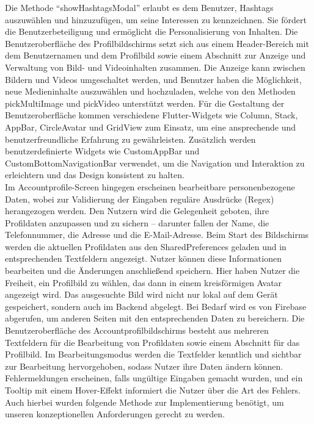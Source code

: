Die Methode ``showHashtagsModal'' erlaubt es dem Benutzer, Hashtags auszuwählen und hinzuzufügen, um seine Interessen zu kennzeichnen. Sie fördert die Benutzerbeteiligung und ermöglicht die Personalisierung von Inhalten.
Die Benutzeroberfläche des Profilbildschirms setzt sich aus einem Header-Bereich mit dem Benutzernamen und dem Profilbild sowie einem Abschnitt zur Anzeige und Verwaltung von Bild- und Videoinhalten zusammen. 
Die Anzeige kann zwischen Bildern und Videos umgeschaltet werden, und Benutzer haben die Möglichkeit, neue Medieninhalte auszuwählen und hochzuladen, welche von den Methoden pickMultiImage und pickVideo unterstützt werden. 
Für die Gestaltung der Benutzeroberfläche kommen verschiedene Flutter-Widgets wie Column, Stack, AppBar, CircleAvatar und GridView zum Einsatz, um eine ansprechende und benutzerfreundliche Erfahrung zu gewährleisten.
Zusätzlich werden benutzerdefinierte Widgets wie CustomAppBar und CustomBottomNavigationBar verwendet, um die Navigation und Interaktion zu erleichtern und das Design konsistent zu halten.
\\
Im Accountprofile-Screen hingegen erscheinen bearbeitbare personenbezogene Daten, wobei zur Validierung der Eingaben reguläre Ausdrücke (Regex) herangezogen werden. 
Den Nutzern wird die Gelegenheit geboten, ihre Profildaten anzupassen und zu sichern – darunter fallen der Name, die Telefonnummer, die Adresse und die E-Mail-Adresse. 
Beim Start des Bildschirms werden die aktuellen Profildaten aus den SharedPreferences geladen und in entsprechenden Textfeldern angezeigt. 
Nutzer können diese Informationen bearbeiten und die Änderungen anschließend speichern. Hier haben Nutzer die Freiheit, ein Profilbild zu wählen, das dann in einem kreisförmigen Avatar angezeigt wird. 
Das ausgesuchte Bild wird nicht nur lokal auf dem Gerät gespeichert, sondern auch im Backend abgelegt. Bei Bedarf wird es von Firebase abgerufen, um anderen Seiten mit den entsprechenden Daten zu bereichern. Die Benutzeroberfläche des Accountprofilbildschirms besteht aus mehreren Textfeldern für die Bearbeitung von Profildaten sowie einem Abschnitt für das Profilbild. 
Im Bearbeitungsmodus werden die Textfelder kenntlich und sichtbar zur Bearbeitung hervorgehoben, sodass Nutzer ihre Daten ändern können. Fehlermeldungen erscheinen, falls ungültige Eingaben gemacht wurden, und ein Tooltip mit einem Hover-Effekt informiert die Nutzer über die Art des Fehlers.
Auch hierbei wurden folgende Methode zur Implementierung benötigt, um unseren konzeptionellen Anforderungen gerecht zu werden.
\\
